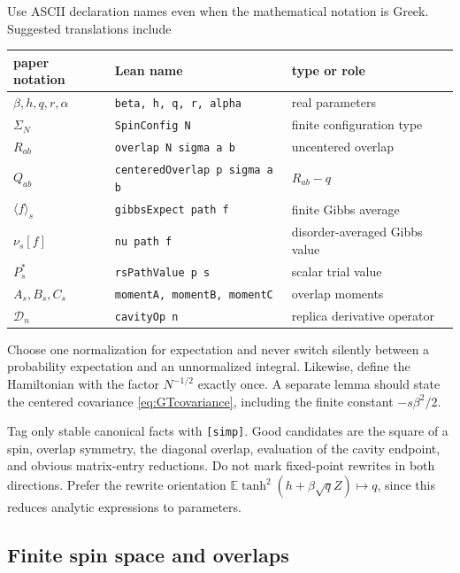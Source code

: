 \documentclass[11pt]{article}
\numberwithin{equation}{section}
\newcommand{\E}{\mathbb{E}}
\newcommand{\1}{\mathbf 1}
\begin{document}
Use ASCII declaration names even when the mathematical notation is Greek.
Suggested translations include
\begin{center}
\begin{tabular}{lll}
\toprule
paper notation & Lean name & type or role\\
\midrule
$\beta,h,q,r,\alpha$ & \texttt{beta, h, q, r, alpha} & real parameters\\
$\Sigma_N$ & \texttt{SpinConfig N} & finite configuration type\\
$R_{ab}$ & \texttt{overlap N sigma a b} & uncentered overlap\\
$Q_{ab}$ & \texttt{centeredOverlap p sigma a b} & $R_{ab}-q$\\
$\langle f\rangle_s$ & \texttt{gibbsExpect path f} & finite Gibbs average\\
$\nu_s[f]$ & \texttt{nu path f} & disorder-averaged Gibbs value\\
$P_s^*$ & \texttt{rsPathValue p s} & scalar trial value\\
$A_s,B_s,C_s$ & \texttt{momentA, momentB, momentC} & overlap moments\\
$\mathcal D_n$ & \texttt{cavityOp n} & replica derivative operator\\
\bottomrule
\end{tabular}
\end{center}

Choose one normalization for expectation and never switch silently between
a probability expectation and an unnormalized integral.  Likewise, define
the Hamiltonian with the factor $N^{-1/2}$ exactly once.  A separate lemma
should state the centered covariance \eqref{eq:GTcovariance}, including the
finite constant $-s\beta^2/2$.

Tag only stable canonical facts with \texttt{[simp]}.  Good candidates are
the square of a spin, overlap symmetry, the diagonal overlap, evaluation of
the cavity endpoint, and obvious matrix-entry reductions.  Do not mark
fixed-point rewrites in both directions.  Prefer the rewrite orientation
$\E\tanh^2(h+\beta\sqrt q Z)\mapsto q$, since this reduces analytic
expressions to parameters.

\subsection{Finite spin space and overlaps}
\end{document}
